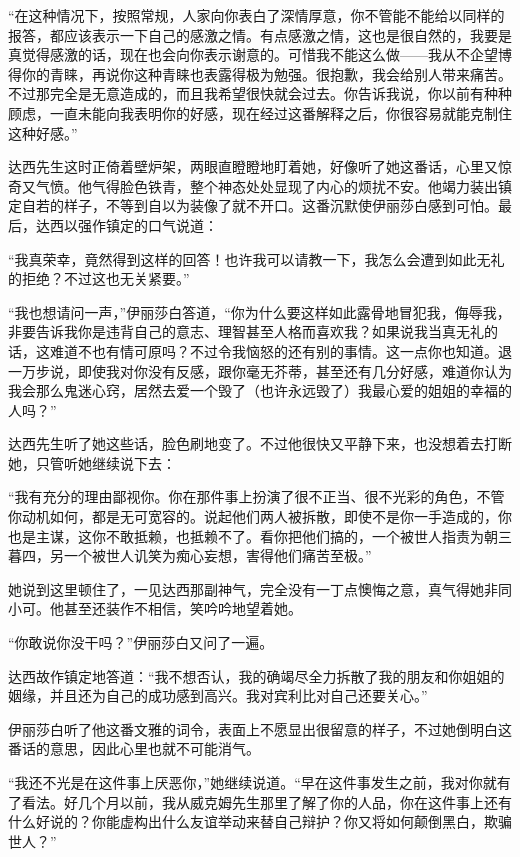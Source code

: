 \par “在这种情况下，按照常规，人家向你表白了深情厚意，你不管能不能给以同样的报答，都应该表示一下自己的感激之情。有点感激之情，这也是很自然的，我要是真觉得感激的话，现在也会向你表示谢意的。可惜我不能这么做——我从不企望博得你的青睐，再说你这种青睐也表露得极为勉强。很抱歉，我会给别人带来痛苦。不过那完全是无意造成的，而且我希望很快就会过去。你告诉我说，你以前有种种顾虑，一直未能向我表明你的好感，现在经过这番解释之后，你很容易就能克制住这种好感。”
\par 达西先生这时正倚着壁炉架，两眼直瞪瞪地盯着她，好像听了她这番话，心里又惊奇又气愤。他气得脸色铁青，整个神态处处显现了内心的烦扰不安。他竭力装出镇定自若的样子，不等到自以为装像了就不开口。这番沉默使伊丽莎白感到可怕。最后，达西以强作镇定的口气说道：
\par “我真荣幸，竟然得到这样的回答！也许我可以请教一下，我怎么会遭到如此无礼的拒绝？不过这也无关紧要。”
\par “我也想请问一声，”伊丽莎白答道，“你为什么要这样如此露骨地冒犯我，侮辱我，非要告诉我你是违背自己的意志、理智甚至人格而喜欢我？如果说我当真无礼的话，这难道不也有情可原吗？不过令我恼怒的还有别的事情。这一点你也知道。退一万步说，即使我对你没有反感，跟你毫无芥蒂，甚至还有几分好感，难道你认为我会那么鬼迷心窍，居然去爱一个毁了（也许永远毁了）我最心爱的姐姐的幸福的人吗？”
\par 达西先生听了她这些话，脸色刷地变了。不过他很快又平静下来，也没想着去打断她，只管听她继续说下去：
\par “我有充分的理由鄙视你。你在那件事上扮演了很不正当、很不光彩的角色，不管你动机如何，都是无可宽容的。说起他们两人被拆散，即使不是你一手造成的，你也是主谋，这你不敢抵赖，也抵赖不了。看你把他们搞的，一个被世人指责为朝三暮四，另一个被世人讥笑为痴心妄想，害得他们痛苦至极。”
\par 她说到这里顿住了，一见达西那副神气，完全没有一丁点懊悔之意，真气得她非同小可。他甚至还装作不相信，笑吟吟地望着她。
\par “你敢说你没干吗？”伊丽莎白又问了一遍。
\par 达西故作镇定地答道：“我不想否认，我的确竭尽全力拆散了我的朋友和你姐姐的姻缘，并且还为自己的成功感到高兴。我对宾利比对自己还要关心。”
\par 伊丽莎白听了他这番文雅的词令，表面上不愿显出很留意的样子，不过她倒明白这番话的意思，因此心里也就不可能消气。
\par “我还不光是在这件事上厌恶你，”她继续说道。“早在这件事发生之前，我对你就有了看法。好几个月以前，我从威克姆先生那里了解了你的人品，你在这件事上还有什么好说的？你能虚构出什么友谊举动来替自己辩护？你又将如何颠倒黑白，欺骗世人？”
